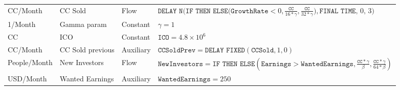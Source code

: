 \begin{longtable}[c]{p{1.71cm}p{2cm}p{1.5cm}p{11cm}}
CC/Month       & CC Sold              & Flow                      & \small$\displaystyle \texttt{DELAY N}\bigg( \texttt{IF THEN ELSE}\bigg( \texttt{GrowthRate} < 0 , \frac{\texttt{CC}}{16*\gamma}, \frac{\texttt{CC}}{32*\gamma}\bigg),\texttt{FINAL TIME} ,\, 0 ,\, 3 \bigg)$                                                                                                                                                                                                                                                         \\[4mm]
1/Month        & Gamma param          & Constant                  & \small$\displaystyle\gamma=1$                                                                                                                                                                                                                                                                                                                    \\[4mm]
CC             & ICO                  & Constant                  & \small$\displaystyle \texttt{ICO}=4.8 \times 10^{6}$                                                                                                                                                                                                                                                                                                       \\[4mm]
CC/Month       & CC Sold previous     & Auxiliary                 & \small$\displaystyle\texttt{CCSoldPrev}= \texttt{DELAY FIXED}(\texttt{CCSold}, 1, 0 )$                                                                                                                                                                                                                                                    \\[4mm]
People/Month   & New Investors        & Flow                      & \small$\displaystyle\texttt{NewInvestors}= \texttt{IF THEN ELSE}\left(\texttt{Earnings} > \texttt{WantedEarnings},\frac{\texttt{CC}*\gamma}{\beta} , \frac{\texttt{CC}*\gamma}{64*\beta}\right)$                                                                                                                                                                                     \\[4mm]
USD/Month      & Wanted Earnings      & Auxiliary                 & \small$\displaystyle\texttt{WantedEarnings}=250$                                                                                                                                                                                                                                                                                                \\[4mm]

\end{longtable}
